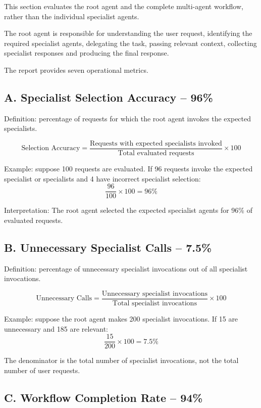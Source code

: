 \documentclass[11pt,a4paper]{article}
\begin{document}
This section evaluates the root agent and the complete multi-agent workflow, rather than the individual specialist agents.

The root agent is responsible for understanding the user request, identifying the required specialist agents, delegating the task, passing relevant context, collecting specialist responses and producing the final response.

The report provides seven operational metrics.

\subsection{A. Specialist Selection Accuracy -- 96\%}

Definition: percentage of requests for which the root agent invokes the expected specialists.

\[
\text{Selection Accuracy} =
\frac{\text{Requests with expected specialists invoked}}
     {\text{Total evaluated requests}}\times 100
\]

Example: suppose 100 requests are evaluated. If 96 requests invoke the expected specialist or specialists and 4 have incorrect specialist selection:
\[
\frac{96}{100}\times 100=96\%
\]

Interpretation: The root agent selected the expected specialist agents for 96\% of evaluated requests.

\subsection{B. Unnecessary Specialist Calls -- 7.5\%}

Definition: percentage of unnecessary specialist invocations out of all specialist invocations.

\[
\text{Unnecessary Calls} =
\frac{\text{Unnecessary specialist invocations}}
     {\text{Total specialist invocations}}\times 100
\]

Example: suppose the root agent makes 200 specialist invocations. If 15 are unnecessary and 185 are relevant:
\[
\frac{15}{200}\times 100=7.5\%
\]

The denominator is the total number of specialist invocations, not the total number of user requests.

\subsection{C. Workflow Completion Rate -- 94\%}
\end{document}
